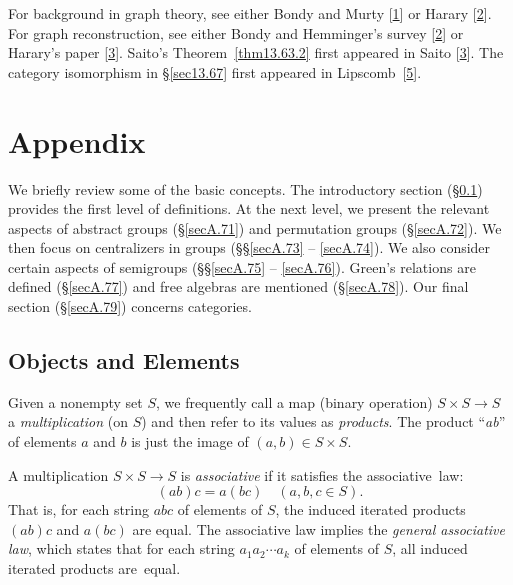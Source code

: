 \documentclass{surv-l}
\numberwithin{equation}{section}
\numberwithin{table}{section}
\numberwithin{figure}{section}
\theoremstyle{definition}
\begin{document}
For background in graph theory, see either Bondy and
Murty [\hyperlink{bib5}{1}] or
Harary [\hyperlink{bib27a}{2}]. For
graph reconstruction, see either Bondy and
Hemminger's survey
[\hyperlink{bib6}{2}] or Harary's paper
[\hyperlink{bib27b}{3}]. Saito's
Theorem~\ref{thm13.63.2} first appeared in
Saito [\hyperlink{bib67b}{3}]. The
category isomorphism in \S\ref{sec13.67} first appeared in
Lipscomb~[\hyperlink{bib43d}{5}].


\chapter*{Appendix}\label{chapA}

We briefly review some of the basic concepts. The introductory
section (\S\ref{secA.70}) provides the first level of
definitions. At the next level, we present the relevant
aspects of abstract groups (\S\ref{secA.71}) and permutation
groups (\S\ref{secA.72}). We then focus on centralizers in
groups (\S\S\ref{secA.73} -- \ref{secA.74}). We also consider
certain aspects of semigroups (\S\S\ref{secA.75} --
\ref{secA.76}). Green's relations are defined
(\S\ref{secA.77}) and free algebras are mentioned
(\S\ref{secA.78}). Our final section (\S\ref{secA.79})
concerns categories.

\setcounter{section}{69}

\section{Objects and Elements}\label{secA.70}

Given a nonempty set $S$, we frequently call a map (binary
operation) $S\times S \rightarrow S$ a
\emph{multiplication} (on $S$) and then
refer to its values as \emph{products}. The
product ``\emph{ab}'' of elements $a$ and $b$ is just the image of
$(a, b)\in S\times S$.

A multiplication $S\times S\rightarrow S$ is
\emph{associative} if it
satisfies the associative~law:
\[
(ab)c=a(bc)\quad (a,b, c\in S).
\]
That is, for each string $abc$ of elements of $S$, the induced
iterated products $(ab)c$ and $a(bc)$ are equal. The associative
law implies the \emph{general associative law}, which states that for each string
$a_{1}a_{2}\cdots a_{k}$ of elements of $S$, all induced iterated
products are~equal.
\end{document}

